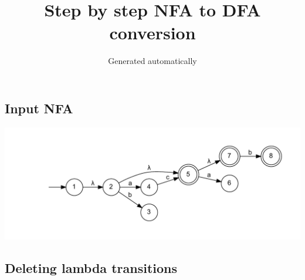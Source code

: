 \documentclass{article}
\title{\textbf{Step by step NFA to DFA conversion}}
\author{Generated automatically}
\begin{document}
\maketitle
\begin{center}
\section{Input NFA}
\includegraphics[width=\textwidth]{step0.dot.pdf}
\end{center}
\begin{center}
\section{Deleting lambda transitions}
\end{center}
\end{document}
